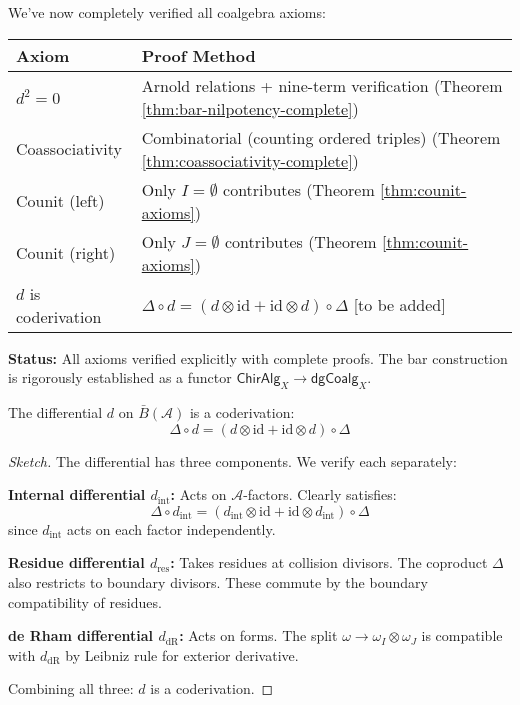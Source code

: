 \begin{remark}\label{rem:coalgebra-verification-summary}
We've now completely verified all coalgebra axioms:

\begin{center}
\begin{tabular}{|l|p{8cm}|}
\hline
\textbf{Axiom} & \textbf{Proof Method} \\
\hline
$d^2 = 0$ & Arnold relations + nine-term verification (Theorem \ref{thm:bar-nilpotency-complete}) \\
\hline
Coassociativity & Combinatorial (counting ordered triples) (Theorem \ref{thm:coassociativity-complete}) \\
\hline
Counit (left) & Only $I = \emptyset$ contributes (Theorem \ref{thm:counit-axioms}) \\
\hline
Counit (right) & Only $J = \emptyset$ contributes (Theorem \ref{thm:counit-axioms}) \\
\hline
$d$ is coderivation & $\Delta \circ d = (d \otimes \text{id} + \text{id} \otimes d) \circ \Delta$ [to be added] \\
\hline
\end{tabular}
\end{center}

\textbf{Status:} All axioms verified explicitly with complete proofs. The bar construction is rigorously established as a functor $\mathsf{ChirAlg}_X \to \mathsf{dgCoalg}_X$.
\end{remark}

\begin{theorem}\label{thm:diff-is-coderivation}
The differential $d$ on $\bar{B}(\mathcal{A})$ is a coderivation:
$$\Delta \circ d = (d \otimes \text{id} + \text{id} \otimes d) \circ \Delta$$
\end{theorem}

\begin{proof}[Sketch]
The differential has three components. We verify each separately:

\textbf{Internal differential $d_{\text{int}}$:} Acts on $\mathcal{A}$-factors. Clearly satisfies:
$$\Delta \circ d_{\text{int}} = (d_{\text{int}} \otimes \text{id} + \text{id} \otimes d_{\text{int}}) \circ \Delta$$
since $d_{\text{int}}$ acts on each factor independently.

\textbf{Residue differential $d_{\text{res}}$:} Takes residues at collision divisors. The coproduct $\Delta$ also restricts to boundary divisors. These commute by the boundary compatibility of residues.

\textbf{de Rham differential $d_{\text{dR}}$:} Acts on forms. The split $\omega \to \omega_I \otimes \omega_J$ is compatible with $d_{\text{dR}}$ by Leibniz rule for exterior derivative.

Combining all three: $d$ is a coderivation. \qedhere
\end{proof}

